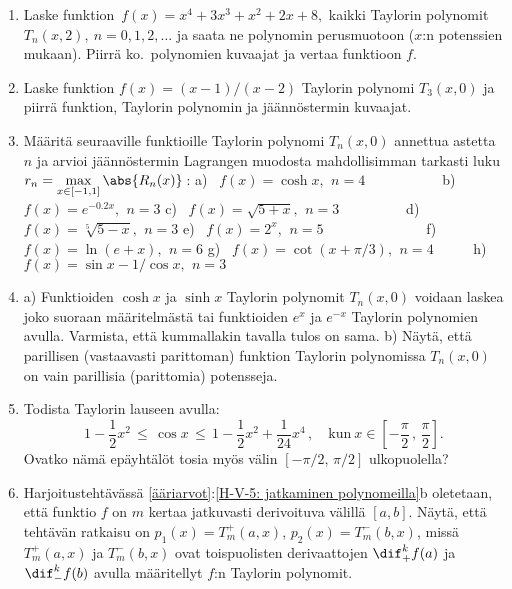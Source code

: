 \Harj
\begin{enumerate}

\item
Laske funktion $\,f(x)=x^4+3x^3+x^2+2x+8,$ kaikki Taylorin polynomit $T_n(x,2),\ n=0,1,2,\ldots$
ja saata ne polynomin perusmuotoon ($x$:n potenssien mukaan). Piirrä ko.\ polynomien kuvaajat
ja vertaa funktioon $f$.

\item
Laske funktion $f(x)=(x-1)/(x-2)$ Taylorin polynomi $T_3(x,0)$ ja piirrä funktion, Taylorin
polynomin ja jäännöstermin kuvaajat.
 
\item
Määritä seuraaville funktioille Taylorin polynomi $T_n(x,0)$ annettua astetta $n$ ja arvioi 
jäännöstermin Lagrangen muodosta mahdollisimman tarkasti luku 
$\displaystyle{r_n=\max_{x\in[-1,1]}\abs{R_n(x)}}$\,: \newline
a) \ $f(x)=\cosh x,\,\ n=4\qquad\qquad\quad\,$ b) \ $f(x)=e^{-0.2x},\,\ n=3$ \newline
c) \ $f(x)=\sqrt{5+x},\,\ n=3\qquad\qquad\ \ $ d) \ $f(x)=\sqrt[5]{5-x},\,\ n=3$ \newline
e) \ $f(x)=2^x,\,\ n=5\qquad\qquad\qquad\quad$ f) \  $f(x)=\ln(e+x),\,\ n=6$ \newline
g) \ $f(x)=\cot(x+\pi/3),\,\ n=4\qquad$ \      h) \ $f(x)=\sin x-1/\cos x,\,\ n=3$

\item
a) Funktioiden $\cosh x$ ja $\sinh x$ Taylorin polynomit $T_n(x,0)$ voidaan laskea joko suoraan
määritelmästä tai funktioiden $e^x$ ja $e^{-x}$ Taylorin polynomien avulla. Varmista, että
kummallakin tavalla tulos on sama. \vspace{1mm}\newline
b) Näytä, että parillisen (vastaavasti parittoman) funktion Taylorin polynomissa $T_n(x,0)$ on
vain parillisia (parittomia) potensseja.

\item
Todista Taylorin lauseen avulla:
\[
1-\frac{1}{2}x^2\,\le\,\cos x\,\le\,1-\frac{1}{2}x^2+\frac{1}{24}x^4\,, \quad
                                 \text{kun}\ x\in\left[-\frac{\pi}{2}\,,\,\frac{\pi}{2}\right].
\]
Ovatko nämä epäyhtälöt tosia myös välin $[-\pi/2,\,\pi/2]$ ulkopuolella?

\item
Harjoitustehtävässä \ref{ääriarvot}:\ref{H-V-5: jatkaminen polynomeilla}b oletetaan, että
funktio $f$ on $m$ kertaa jatkuvasti derivoituva välillä $[a,b]$. Näytä, että tehtävän
ratkaisu on $p_1(x)=T_m^+(a,x)$, $p_2(x)=T_m^-(b,x)$, missä $T_m^+(a,x)$ ja
$T_m^-(b,x)$ ovat toispuolisten derivaattojen $\dif_+^kf(a)$ ja $\dif_-^kf(b)$ avulla
määritellyt $f$:n Taylorin polynomit.


\end{enumerate}
